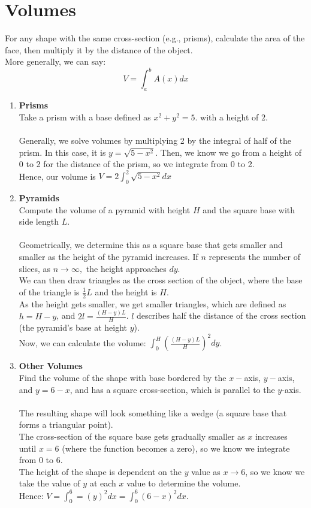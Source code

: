 \documentclass{article}
\begin{document}
\section{Volumes}
For any shape with the same cross-section (e.g., prisms), calculate the area of the face, then multiply it by the distance of the object.\\
More generally, we can say:
$$V = \int_a^b A(x) dx$$

\begin{enumerate}
    \item \textbf{Prisms}\\
    Take a prism with a base defined as $x^2 + y^2 = 5$. with a height of $2$.\\\\
    Generally, we solve volumes by multiplying 2 by the integral of half of the prism. In this case, it is $y = \sqrt{5-x^2}$. Then, we know we go from a height of 0 to 2 for the distance of the prism, so we integrate from 0 to 2.\\
    Hence, our volume is $V = 2 \int_0^2 \sqrt{5 - x^2} dx$
    \item \textbf{Pyramids}\\
    Compute the volume of a pyramid with height $H$ and the square base with side length $L$.\\\\
    Geometrically, we determine this as a square base that gets smaller and smaller as the height of the pyramid increases. If $n$ represents the number of slices, as $n \to \infty,$ the height approaches $dy$.\\
    We can then draw triangles as the cross section of the object, where the base of the triangle is $\frac{1}{2} L$ and the height is $H$. \\
    As the height gets smaller, we get smaller triangles, which are defined as $h = H - y$, and $2l = \frac{(H-y)L}{H}$. $l$ describes half the distance of the cross section (the pyramid's base at height $y$).\\
    Now, we can calculate the volume: $\int_0^H (\frac{(H-y)L}{H})^2 dy$.
    \item \textbf{Other Volumes}\\
    Find the volume of the shape with base bordered by the $x-$axis, $y-$axis, and $y= 6-x$, and has a square cross-section, which is parallel to the $y$-axis.\\\\
    The resulting shape will look something like a wedge (a square base that forms a triangular point).\\
    The cross-section of the square base gets gradually smaller as $x$ increases until $x = 6$ (where the function becomes a zero), so we know we integrate from 0 to 6.\\
    The height of the shape is dependent on the $y$ value as $x \to 6$, so we know we take the value of $y$ at each $x$ value to determine the volume.\\
    Hence:  $V = \int_0^6 = (y)^2 dx = \int_0^6 (6-x)^2 dx$.
\end{enumerate}
\end{document}
